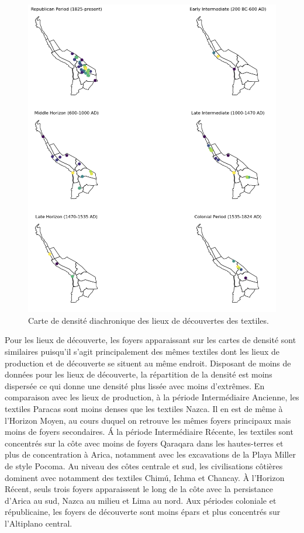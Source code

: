 \begin{figure}[!h]
	\begin{center}
		\includegraphics[width=15cm]{../images/diachDensityFind.png}
		\caption{Carte de densité diachronique des lieux de découvertes des textiles.}
		\label{fig:density_find}
	 \end{center}
\end{figure}

Pour les lieux de découverte, les foyers apparaissant sur les cartes de densité sont similaires puisqu'il s'agit principalement des mêmes textiles dont les lieux de production et de découverte se situent au même endroit. Disposant de moins de données pour les lieux de découverte, la répartition de la densité est moins dispersée ce qui donne une densité plus lissée avec moins d'extrêmes. En comparaison avec les lieux de production, à la période Intermédiaire Ancienne, les textiles Paracas sont moins denses que les textiles Nazca. Il en est de même à l'Horizon Moyen, au cours duquel on retrouve les mêmes foyers principaux mais moins de foyers secondaires. Á la période Intermédiaire Récente, les textiles sont concentrés sur la côte avec moins de foyers Qaraqara dans les hautes-terres et plus de concentration à Arica, notamment avec les excavations de la Playa Miller de style Pocoma. Au niveau des côtes centrale et sud, les civilisations côtières dominent avec notamment des textiles Chimú, Ichma et Chancay. À l'Horizon Récent, seuls trois foyers apparaissent le long de la côte avec la persistance d'Arica au sud, Nazca au milieu et Lima au nord. Aux périodes coloniale et républicaine, les foyers de découverte sont moins épars et plus concentrés sur l'Altiplano central. 


